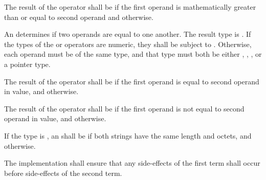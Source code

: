 \specsubsubitem
The result of the \terminal{>=} operator shall be  if the first
operand is mathematically greater than or equal to second operand
and  otherwise.

\specsubsubitem
An  determines if two operands are equal to one
another. The result type is . If the types of the \terminal{==}
or \terminal{!=} operators are numeric, they shall be subject to
. Otherwise, each operand must be of the same type, and
that type must both be either , , ,
or a pointer type.

\specsubsubitem
The result of the \terminal{==} operator shall be  if the first
operand is equal to second operand in value, and  otherwise.

\specsubsubitem
The result of the \terminal{!=} operator shall be  if the first
operand is not equal to second operand in value, and  otherwise.

\specsubsubitem
If the type is , an  shall be
 if both strings have the same length and octets, and
 otherwise.

\specsubsubitem
The implementation shall ensure that any side-effects of the first term shall
occur before side-effects of the second term.


\begin{grammar}
 \\
	 \\
	 \terminal{\&\&}  \\

 \\
	 \\
	 \terminal{\textasciicircum\textasciicircum}  \\

 \\
	 \\
	 \terminal{||}  \\
\end{grammar}

